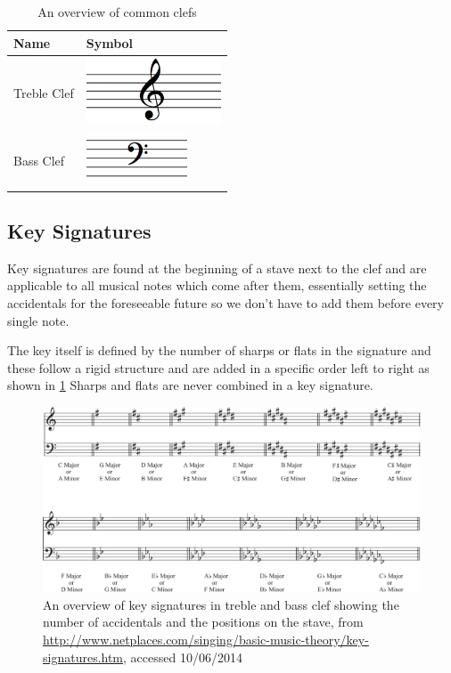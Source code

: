 \begin{table}[H]
    \renewcommand{\arraystretch}{1.8}
    \centering
    \begin{tabularx}{.4\textwidth}{ l l }
        \toprule
        Name & Symbol \\
        \midrule
        Treble Clef & \includegraphics[height=2cm]{gfx/music-theory/clef-treble.png} \\
        Bass Clef   & \includegraphics[height=1.5cm]{gfx/music-theory/clef-bass.png} \\
        \bottomrule
    \end{tabularx}
    \caption{An overview of common clefs}
    \label{table:clefs}
\end{table}

\subsection{Key Signatures}
\label{sec:music-theory-key-signatures}

Key signatures are found at the beginning of a stave next to the clef and are applicable to all musical notes which come after them, essentially setting the accidentals for the foreseeable future so we don't have to add them before every single note.

The key itself is defined by the number of sharps or flats in the signature and these follow a rigid structure and are added in a specific order left to right as shown in \cref{table:key-signatures} Sharps and flats are never combined in a key signature.


\begin{figure}[H]
    \includegraphics[width=\linewidth]{gfx/music-theory/key-signatures.jpg}
    \caption{An overview of key signatures in treble and bass clef showing the number of accidentals and the positions on the stave, from \url{http://www.netplaces.com/singing/basic-music-theory/key-signatures.htm}, accessed 10/06/2014}
    \label{table:key-signatures}
\end{figure}



